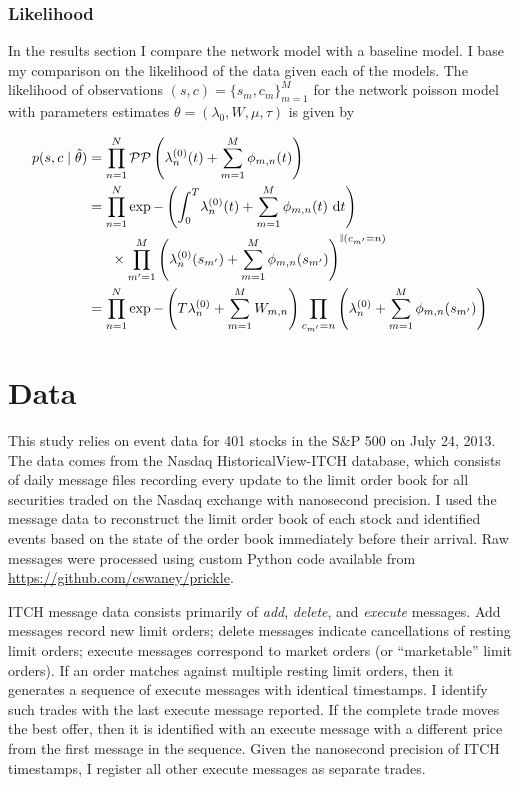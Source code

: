 		\subsubsection*{Likelihood}
			In the results section I compare the network model with a baseline model. I base my comparison on the likelihood of the data given each of the models. The likelihood of observations $(s, c) = \{s_m, c_m\}_{m=1}^M$ for the network poisson model with parameters estimates $\theta = (\lambda_0, W, \mu, \tau)$ is given by

			\begin{align}
			\label{eqn:likelihood}
				p(s, c \mid \hat{\theta}) &= \prod_{n=1}^{N} \mathcal{PP} \left( \lambda_n^{(0)}(t) + \sum_{m=1}^{M} \phi_{m , n}(t) \right) \notag \\
				&= \prod_{n=1}^N \exp -\left( \int_{0}^{T} \! \lambda_n^{(0)}(t) + \sum_{m=1}^{M} \phi_{m , n}(t) \ \mathrm{d}t \right) \notag \\
				& \ \ \ \ \ \times \prod_{m'=1}^M \left( \lambda_n^{(0)}(s_{m'}) + \sum_{m=1}^{M} \phi_{m , n}(s_{m'}) \right)^{\mathbb{I} (c_{m'} = n)} \notag \\
				&= \prod_{n=1}^N \exp -\left(T \lambda_n^{(0)} + \sum_{m=1}^M W_{m,n} \right) \prod_{c_{m'}=n} \left( \lambda_n^{(0)} + \sum_{m=1}^{M} \phi_{m , n}(s_{m'}) \right)
			\end{align}

			\vspace{5mm}


\section{Data}
	This study relies on event data for 401 stocks in the S\&P 500 on July 24, 2013. The data comes from the Nasdaq HistoricalView-ITCH database, which consists of daily message files recording every update to the limit order book for all securities traded on the Nasdaq exchange with nanosecond precision. I used the message data to reconstruct the limit order book of each stock and identified events based on the state of the order book immediately before their arrival. Raw messages were processed using custom Python code available from \url{https://github.com/cswaney/prickle}.

	ITCH message data consists primarily of \textit{add}, \textit{delete}, and \textit{execute} messages. Add messages record new limit orders; delete messages indicate cancellations of resting limit orders; execute messages correspond to market orders (or ``marketable'' limit orders). If an order matches against multiple resting limit orders, then it generates a sequence of execute messages with identical timestamps. I identify such trades with the last execute message reported. If the complete trade moves the best offer, then it is identified with an execute message with a different price from the first message in the sequence. Given the nanosecond precision of ITCH timestamps, I register all other execute messages as separate trades.

